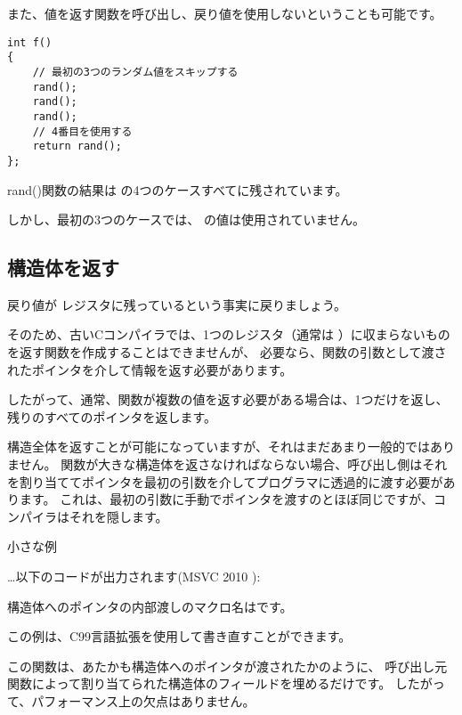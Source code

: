 また、値を返す関数を呼び出し、戻り値を使用しないということも可能です。

\begin{lstlisting}[style=customc]
int f()
{
    // 最初の3つのランダム値をスキップする
    rand();
    rand();
    rand();
    // 4番目を使用する
    return rand();
};
\end{lstlisting}

rand()関数の結果は \EAX の4つのケースすべてに残されています。

しかし、最初の3つのケースでは、 \EAX の値は使用されていません。

\subsection{構造体を返す}


戻り値が \EAX レジスタに残っているという事実に戻りましょう。

そのため、古いCコンパイラでは、1つのレジスタ（通常は \Tint ）に収まらないものを返す関数を作成することはできませんが、
必要なら、関数の引数として渡されたポインタを介して情報を返す必要があります。

したがって、通常、関数が複数の値を返す必要がある場合は、1つだけを返し、
残りのすべてのポインタを返します。

構造全体を返すことが可能になっていますが、それはまだあまり一般的ではありません。
関数が大きな構造体を返さなければならない場合、呼び出し側はそれを割り当ててポインタを最初の引数を介してプログラマに透過的に渡す必要があります。
これは、最初の引数に手動でポインタを渡すのとほぼ同じですが、コンパイラはそれを隠します。

小さな例



\dots 以下のコードが出力されます(MSVC 2010 \Ox):



構造体へのポインタの内部渡しのマクロ名はです。

この例は、C99言語拡張を使用して書き直すことができます。





この関数は、あたかも構造体へのポインタが渡されたかのように、
呼び出し元関数によって割り当てられた構造体のフィールドを埋めるだけです。
したがって、パフォーマンス上の欠点はありません。
